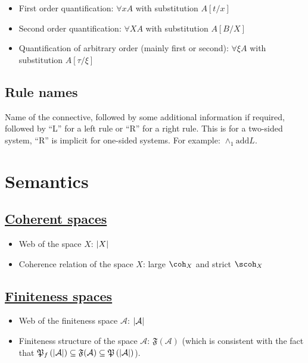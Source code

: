 \begin{itemize}
\item
  First order quantification:
  $\forall x
  A$ with substitution
  $A[t/x]$
\item
  Second order quantification:
  $\forall X
  A$ with substitution
  $A[B/X]$
\item
  Quantification of arbitrary order (mainly first or second):
  $\forall\xi
  A$ with substitution
  $A[\tau/\xi]$
\end{itemize}

\subsection{Rule names}\label{rule-names}

Name of the connective, followed by some additional information if
required, followed by ``L'' for a left rule or ``R'' for a right rule. This
is for a two-sided system, ``R'' is implicit for one-sided systems. For
example: $\wedge_1
\text{add} L$.

\section{Semantics}

\subsection{\texorpdfstring{\hyperref[coherent-semantics]{Coherent spaces}}{Coherent spaces}}\label{notations-coherent-spaces}

\begin{itemize}
\item Web of the space $X$: $\left|X\right|$
\item Coherence relation of the space $X$: large $\coh_X$ and strict $\scoh_X$
\end{itemize}

\subsection{\texorpdfstring{\hyperref[finiteness-semantics]{Finiteness spaces}}{Finiteness spaces}}\label{notations-finiteness-spaces}

\begin{itemize}
\item
  Web of the finiteness space
  $\mathcal
  A$:
  $\left|\mathcal
  A\right|$
\item
  Finiteness structure of the space
  $\mathcal
  A$:
  $\mathfrak
  F(\mathcal A)$ (which is consistent with the fact that
  $\mathfrak{P}_f\left(\left|\mathcal
  A\right|\right)\subseteq \mathfrak
  F(\mathcal A)
  \subseteq\mathfrak{P}\left(\left|\mathcal
  A\right|\right)$).
\end{itemize}

